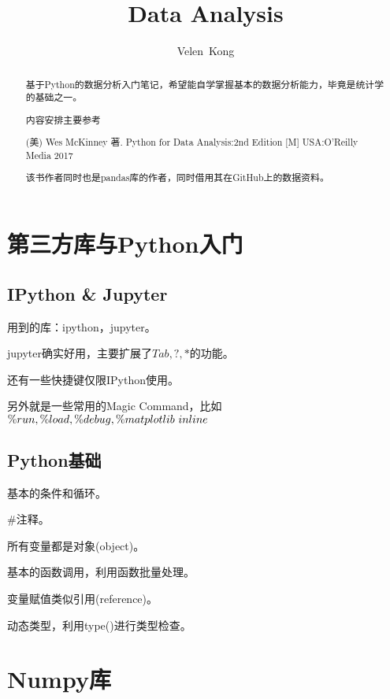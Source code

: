 \documentclass[UTF8]{ctexart}
\begin{document}
\pagestyle{headings}
\title{Data Analysis}
\author{Velen~Kong
}
\maketitle
\begin{abstract}

基于Python的数据分析入门笔记，希望能自学掌握基本的数据分析能力，毕竟是统计学的基础之一。

内容安排主要参考

(美) Wes McKinney 著. Python for Data Analysis:2nd Edition [M] USA:O'Reilly Media 2017

该书作者同时也是pandas库的作者，同时借用其在GitHub上的数据资料。

\end{abstract}

\section{第三方库与Python入门}

\subsection{IPython \& Jupyter}

用到的库：ipython，jupyter。

jupyter确实好用，主要扩展了$Tab,?,*$的功能。

还有一些快捷键仅限IPython使用。

另外就是一些常用的Magic Command，比如$\%run,\%load,\\
\%debug,\%matplotlib~inline$

\subsection{Python基础}

基本的条件和循环。

\#注释。

所有变量都是对象(object)。

基本的函数调用，利用函数批量处理。

变量赋值类似引用(reference)。

动态类型，利用type()进行类型检查。



\section{Numpy库}
\end{document}
